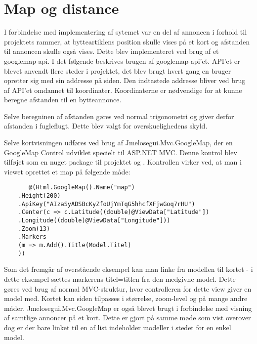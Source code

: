 \section{Map og distance}
I forbindelse med implementering af sytemet var en del af annoncen i forhold til projektets rammer, at bytteartiklens position skulle vises på et kort og afstanden til annoncen skulle også vises. Dette blev implementeret ved brug af et googlemap-api.
I det følgende beskrives brugen af googlemap-api'et. API'et er blevet anvendt flere steder i projektet, det blev brugt hvert gang en bruger opretter sig med sin addresse på siden. Den indtastede addresse bliver ved brug af API'et omdannet til koordinater. Koordinaterne er nødvendige for at kunne beregne afstanden til en bytteannonce.

Selve beregninen af afstanden gøres ved normal trigonometri og giver derfor afstanden i fugleflugt. Dette blev valgt for overskuelighedens skyld. 

Selve kortvisningen udføres ved brug af Jmelosegui.Mvc.GoogleMap, der en GoogleMap Control udviklet specielt til ASP.NET MVC. Denne kontrol blev tilføjet som en nuget package til projektet og . Kontrollen virker ved, at man i viewet oprettet et map på følgende måde:
\begin{verbatim}
	   @(Html.GoogleMap().Name("map")
	.Height(200)
	.ApiKey("AIzaSyADSBcKyZfoUjYmTqG5hhcfXFjwGoq7rHU")
	.Center(c => c.Latitude((double)@ViewData["Latitude"])
	.Longitude((double)@ViewData["Longitude"]))
	.Zoom(13)
	.Markers
	(m => m.Add().Title(Model.Titel)
	))
\end{verbatim}

Som det fremgår af overstående eksempel kan man linke fra modellen til kortet - i dette eksempel sættes markerens titel=titlen fra den medgivne model. Dette gøres ved brug af normal MVC-struktur, hvor controlleren for dette view giver en model med. Kortet kan siden tilpasses i størrelse, zoom-level og på mange andre måder.
Jmelosegui.Mvc.GoogleMap er også blevet brugt i forbindelse med visning af samtlige annoncer på et kort. Dette er gjort på samme møde som vist overover dog er der bare linket til en af list indeholder modeller i stedet for en enkel model.
